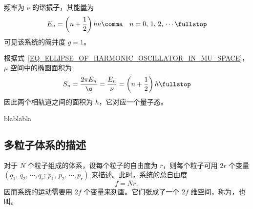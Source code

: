 		\begin{myExample}[一维谐振子]
			频率为 $\nu$ 的谐振子，其能量为
			\begin{equation}
				E_n = \left( n + \frac{1}{2} \right) h \nu \comma \quad n = 0, \, 1, \, 2, \, \cdots \fullstop
			\end{equation}
			可见该系统的简并度 $g = 1$。
			
			根据式~\eqref{EQ_ELLIPSE_OF_HARMONIC_OSCILLATOR_IN_MU_SPACE}，$\mu$ 空间中的椭圆面积为
			\begin{equation}
				S_n = \frac{2\pi E_n}{\o} =\frac{E_n}{\nu} = \left( n + \frac{1}{2} \right) h\fullstop
			\end{equation}
			因此两个相轨道之间的面积为 $h$，它对应一个量子态。
		\end{myExample}
		
		\begin{myExample}[转子]
			blablabla
		\end{myExample}%
		
	\subsection{多粒子体系的描述}
		对于 $N$ 个粒子组成的体系，设每个粒子的自由度为 $r$，则每个粒子可用 $2r$ 个变量 $(q_1, \, q_2, \, \cdots, q_r; \allowbreak \, p_1, \, p_2, \, \cdots, p_r)$ 来描述。此时，系统的总自由度 %
		\begin{equation}
			f = Nr \comma
		\end{equation}
		因而系统的运动需要用 $2f$ 个变量来刻画。它们张成了一个 $2f$ 维空间，称为，也叫。

\raggedbottom%
\pagebreak
